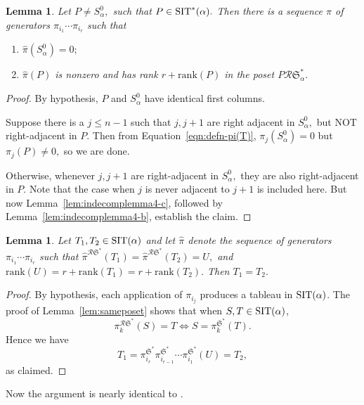 \documentclass[12pt,letterpaper]{amsart}
\newtheorem{lemma}[theorem]{Lemma}
\theoremstyle{definition}
\newcommand{\dI}{\mathfrak{S}^*}
\newcommand{\rdI}{\mathcal{R}\mathfrak{S}^*}
\begin{document}
\begin{lemma}\label{lem:indecomplemma4} Let $P\ne S^0_\alpha,$ such that $P\in \operatorname{SIT}^*(\alpha).$    Then there is a sequence $\hat\pi$ of  generators   
$\pi_{{i_1}}\cdots \pi_{{i_r}}$ such that 
\begin{enumerate}
\item  $\hat\pi(S^0_\alpha)=0;$ 
\item $\hat\pi(P)$ is nonzero and has rank $r+\mathrm{rank}(P)$ in the poset $P\rdI_\alpha.$
\end{enumerate}
\end{lemma}
\begin{proof} By hypothesis, $P$ and $S^0_\alpha$ have identical first columns.  

Suppose there is a $j\le n-1$ such that $j, j+1$ are right adjacent in $S^0_\alpha,$ but NOT right-adjacent in $P.$ 
Then from Equation~\eqref{eqn:defn-pi(T)}, $\pi_j(S^0_\alpha)=0$ but $\pi_j(P)\ne 0,$ so we are done.

Otherwise, whenever $j, j+1$ are right-adjacent in $S^0_\alpha,$ they are also right-adjacent in $P.$ Note that the case when $j$ is never adjacent to $j+1$ is included here.  But now Lemma~\ref{lem:indecomplemma4-c}, followed by Lemma~\ref{lem:indecomplemma4-b}, establish the claim.
\end{proof}

\begin{lemma}\label{lem:injectivity} Let $T_1, T_2\in \operatorname{SIT}(\alpha)$ and let
$\hat\pi$ denote the sequence of generators $\pi_{{i_1}}\cdots \pi_{{i_r}}$  
such that $\hat\pi^{\rdI}(T_1)=\hat\pi^{\rdI}(T_2)=U,$ and    $\mathrm{rank}(U)=r+\mathrm{rank}(T_1)=r+\mathrm{rank}(T_2).$ 
Then $T_1=T_2.$
\end{lemma}
\begin{proof} By hypothesis, each application of $\pi_{{i_j}}$ produces a tableau in $\operatorname{SIT}(\alpha)$.  The proof of Lemma~\ref{lem:sameposet} shows that when $S,T\in \operatorname{SIT}(\alpha)$, 
\[\pi^{\rdI}_k(S)=T \iff S=\pi^{\dI}_k(T).\]
Hence we have 
\[T_1=\pi^{\dI}_{{i_r}}\pi^{\dI}_{{i_{r-1}}}\cdots \pi^{\dI}_{{i_1}} (U)  =T_2,\]
as claimed.
\end{proof}

Now  the argument is nearly identical to \cite[Proof of Theorem 4.1]{BS2021}.
\end{document}

